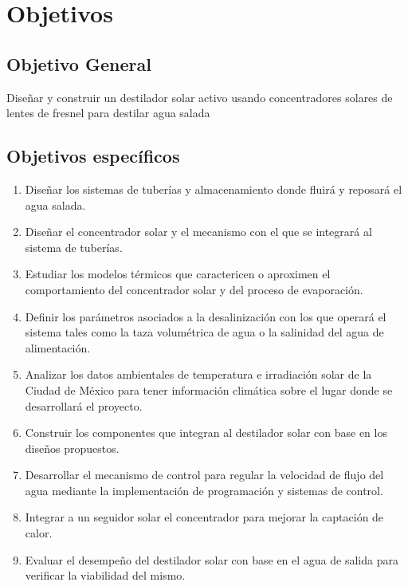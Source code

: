 \chapter{Objetivos}
	\section{Objetivo General}
		Diseñar y construir un destilador solar activo usando concentradores solares de lentes de fresnel para destilar agua salada
	\section{Objetivos específicos}
		\begin{enumerate}[I]
			\item Diseñar los sistemas de tuberías y almacenamiento donde fluirá y reposará el agua salada.
			\item Diseñar el concentrador solar y el mecanismo con el que se integrará al sistema de tuberías.
			\item Estudiar los modelos térmicos que caractericen o aproximen el comportamiento del concentrador solar y del proceso de evaporación.
			\item Definir los parámetros asociados a la desalinización con los que operará el sistema tales como la taza volumétrica de agua o la salinidad del agua de alimentación.
			\item Analizar los datos ambientales de temperatura e irradiación solar de la Ciudad de México para tener información climática sobre el lugar donde se desarrollará el proyecto.
			\item Construir los componentes que integran al destilador solar con base en los diseños propuestos.
			\item Desarrollar el mecanismo de control para regular la velocidad de flujo del agua mediante la implementación de programación y sistemas de control.
			\item Integrar a un seguidor solar el concentrador para mejorar la captación de calor.
			\item Evaluar el desempeño del destilador solar con base en el agua de salida para verificar la viabilidad del mismo.
			\end{enumerate}